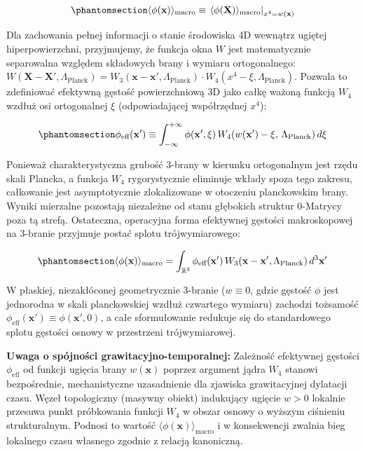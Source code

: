 \documentclass[
  polish,
  letterpaper,
  DIV=11,
  numbers=noendperiod,
  oneside]{scrartcl}
\begin{document}
\begin{equation}\protect\phantomsection\label{eq-1-2-2}{\langle\phi(\mathbf{x})\rangle_{\text{macro}} \equiv \left.\langle\phi(\mathbf{X})\rangle_{\text{macro}}\right|_{x^4 = w(\mathbf{x})}}\end{equation}

Dla zachowania pełnej informacji o stanie środowiska 4D wewnątrz ugiętej
hiperpowierzchni, przyjmujemy, że funkcja okna \(W\) jest matematycznie
separowalna względem składowych brany i wymiaru ortogonalnego:
\(W(\mathbf{X}-\mathbf{X}', \Lambda_{\text{Planck}}) = W_3(\mathbf{x}-\mathbf{x}', \Lambda_{\text{Planck}}) \cdot W_4(x^4 - \xi, \Lambda_{\text{Planck}})\).
Pozwala to zdefiniować efektywną gęstość powierzchniową 3D jako całkę
ważoną funkcją \(W_4\) wzdłuż osi ortogonalnej \(\xi\) (odpowiadającej
współrzędnej \(x^4\)):

\begin{equation}\protect\phantomsection\label{eq-1-2-3}{\phi_{\text{eff}}(\mathbf{x}') \equiv \int_{-\infty}^{+\infty} \phi(\mathbf{x}', \xi) \, W_4\!\left(w(\mathbf{x}') - \xi, \, \Lambda_{\text{Planck}}\right) d\xi}\end{equation}

Ponieważ charakterystyczna grubość 3-brany w kierunku ortogonalnym jest
rzędu skali Plancka, a funkcja \(W_4\) rygorystycznie eliminuje wkłady
spoza tego zakresu, całkowanie jest asymptotycznie zlokalizowane w
otoczeniu planckowskim brany. Wyniki mierzalne pozostają niezależne od
stanu głębokich struktur 0-Matrycy poza tą strefą. Ostateczna,
operacyjna forma efektywnej gęstości makroskopowej na 3-branie przyjmuje
postać splotu trójwymiarowego:

\begin{equation}\protect\phantomsection\label{eq-1-2-4}{\langle\phi(\mathbf{x})\rangle_{\text{macro}} = \int_{\mathbb{R}^3} \phi_{\text{eff}}(\mathbf{x}') \, W_3(\mathbf{x} - \mathbf{x}', \Lambda_{\text{Planck}}) \, d^3\mathbf{x}'}\end{equation}

W płaskiej, niezakłóconej geometrycznie 3-branie (\(w \equiv 0\), gdzie
gęstość \(\phi\) jest jednorodna w skali planckowskiej wzdłuż czwartego
wymiaru) zachodzi tożsamość
\(\phi_{\text{eff}}(\mathbf{x}') \equiv \phi(\mathbf{x}', 0)\), a całe
sformułowanie redukuje się do standardowego splotu gęstości osnowy w
przestrzeni trójwymiarowej.

\textbf{Uwaga o spójności grawitacyjno-temporalnej:} Zależność
efektywnej gęstości \(\phi_{\text{eff}}\) od funkcji ugięcia brany
\(w(\mathbf{x})\) poprzez argument jądra \(W_4\) stanowi bezpośrednie,
mechanistyczne uzasadnienie dla zjawiska grawitacyjnej dylatacji czasu.
Węzeł topologiczny (masywny obiekt) indukujący ugięcie \(w > 0\)
lokalnie przesuwa punkt próbkowania funkcji \(W_4\) w obszar osnowy o
wyższym ciśnieniu strukturalnym. Podnosi to wartość
\(\langle\phi(\mathbf{x})\rangle_{\text{macro}}\) i w konsekwencji
zwalnia bieg lokalnego czasu własnego zgodnie z relacją kanoniczną.
\end{document}
